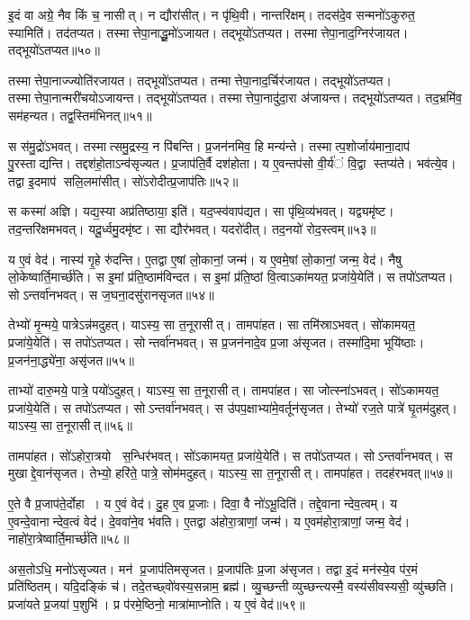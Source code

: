 इ॒दं वा अग्रे॒ नैव किं च॒ नासीत्।
न द्यौरा॑सीत्।
न पृ॑थि॒वी।
नान्तरि॑क्षम्।
तदस॑दे॒व सन्मनो॑ऽकुरुत॒ स्यामिति॑।
तद॑तप्यत।
तस्मात्तेपा॒नाद्धू॒मो॑ऽजायत।
तद्भूयो॑ऽतप्यत।
तस्मात्तेपा॒नाद॒ग्निर॑जायत।
तद्भूयो॑ऽतप्यत॥५०॥

तस्मात्तेपा॒नाज्ज्योति॑रजायत।
तद्भूयो॑ऽतप्यत।
तन्मात्तेपा॒नाद॒र्चिर॑जायत।
तद्भूयो॑ऽतप्यत।
तस्मात्तेपा॒नान्मरी॑चयोऽजायन्त।
तद्भूयो॑ऽतप्यत।
तस्मात्तेपा॒नादु॑दा॒रा अ॑जायन्त।
तद्भूयो॑ऽतप्यत।
तद॒भ्रमि॑व॒ सम॑हन्यत।
तद्व॒स्तिम॑भिनत्॥५१॥

स स॑मु॒द्रो॑ऽभवत्।
तस्मात्समु॒द्रस्य॒ न पि॑बन्ति।
प्र॒जन॑नमिव॒ हि मन्य॑न्ते।
तस्मात्प॒शोर्जाय॑माना॒दाप॑ पु॒रस्ताद्यन्ति।
तद्दश॑हो॒ताऽन्व॑सृज्यत।
प्र॒जाप॑ति॒र्वै दश॑होता।
य ए॒वन्तप॑सो वी॒र्य॑ं वि॒द्वा स्तप्य॑ते।
भव॑त्ये॒व।
तद्वा इ॒दमाप॑ सलि॒लमा॑सीत्।
सो॑ऽरोदीत्प्र॒जाप॑तिः॥५२॥

स कस्मा॑ अज्ञि।
यद्य॒स्या अप्र॑तिष्ठाया॒ इति॑।
यद॒प्स्व॑वाप॑द्यत।
सा पृ॑थि॒व्य॑भवत्।
यद्व्यमृ॑ष्ट।
तद॒न्तरि॑क्षमभवत्।
यदू॒र्ध्वमु॒दमृ॑ष्ट।
सा द्यौर॑भवत्।
यदरो॑दीत्।
तद॒नयो॑ रोद॒स्त्वम्॥५३॥

य ए॒वं वेद॑।
नास्य॑ गृ॒हे रु॑दन्ति।
ए॒तद्वा ए॒षां लो॒कानां॒ जन्म॑।
य ए॒वमे॒षां लो॒कानां॒ जन्म॒ वेद॑।
नैषु लो॒केष्वार्ति॒मार्च्छ॑ति।
स इ॒मां प्र॑ति॒ष्ठाम॑विन्दत।
स इ॒मां प्र॑ति॒ष्ठां वि॒त्वाऽका॑मयत॒ प्रजा॑ये॒येति॑।
स तपो॑ऽतप्यत।
सोऽन्तर्वा॑नभवत्।
स ज॒घना॒दसु॑रानसृजत॥५४॥

तेभ्यो॑ मृ॒न्मये॒ पात्रेऽन्न॑मदुहत्।
याऽस्य॒ सा त॒नूरासीत्।
तामपा॑हत।
सा तमि॑स्राऽभवत्।
सो॑कामयत॒ प्रजा॑ये॒येति॑।
स तपो॑ऽतप्यत।
सोन्तर्वा॑नभवत्।
स प्र॒जन॑नादे॒व प्र॒जा अ॑सृजत।
तस्मा॑दि॒मा भूयि॑ष्ठाः।
प्र॒जन॑ना॒द्ध्ये॑ना॒ असृ॑जत॥५५॥

ताभ्यो॑ दारु॒मये॒ पात्रे॒ पयो॑ऽदुहत्।
याऽस्य॒ सा त॒नूरासीत्।
तामपा॑हत।
सा जोत्स्ना॑ऽभवत्।
सो॑ऽकामयत॒ प्रजा॑ये॒येति॑।
स तपो॑ऽतप्यत।
सोऽन्तर्वा॑नभवत्।
स उ॑पप॒क्षाभ्या॑मे॒वर्तून॑सृजत।
तेभ्यो॑ रज॒ते पात्रे॑ घृ॒तम॑दुहत्।
याऽस्य॒ सा त॒नूरासीत्॥५६॥

तामपा॑हत।
सो॑ऽहोरा॒त्रयो स॒न्धिर॑भवत्।
सो॑ऽकामयत॒ प्रजा॑ये॒येति॑।
स तपो॑ऽतप्यत।
सोऽन्तर्वा॑नभवत्।
स मुखाद्दे॒वान॑सृजत।
तेभ्यो॒ हरि॑ते॒ पात्रे॒ सोम॑मदुहत्।
याऽस्य॒ सा त॒नूरासीत्।
तामपा॑हत।
तदह॑रभवत्॥५७॥

ए॒ते वै प्र॒जाप॑ते॒र्दोहा।
य ए॒वं वेद॑।
दु॒ह ए॒व प्र॒जाः।
दिवा॒ वै नो॑ऽभू॒दिति॑।
तद्दे॒वानान्देव॒त्वम्।
य ए॒वन्दे॒वानान्देव॒त्वं वेद॑।
दे॒ववा॑ने॒व भ॑वति।
ए॒तद्वा अ॑होरा॒त्राणां॒ जन्म॑।
य ए॒वम॑होरा॒त्राणां॒ जन्म॒ वेद॑।
नाहो॑रा॒त्रेष्वार्ति॒मार्च्छ॑ति॥५८॥

अस॒तोऽधि॒ मनो॑ऽसृज्यत।
मन॑ प्र॒जाप॑तिमसृजत।
प्र॒जाप॑तिः प्र॒जा अ॑सृजत।
तद्वा इ॒दं मन॑स्ये॒व प॑र॒मं प्रति॑ष्ठितम्।
यदि॒दङ्किं च॑।
तदे॒तच्छ्वो॑वस्य॒सन्नाम॒ ब्रह्म॑।
व्यु॒च्छन्तीव्युच्छन्त्यस्मै॒ वस्य॑सीवस्यसी॒ व्यु॑च्छति।
प्रजा॑यते प्र॒जया॑ प॒शुभि॑।
प्र प॑रमे॒ष्ठिनो॒ मात्रा॑माप्नोति।
य ए॒वं वेद॑॥५९॥


